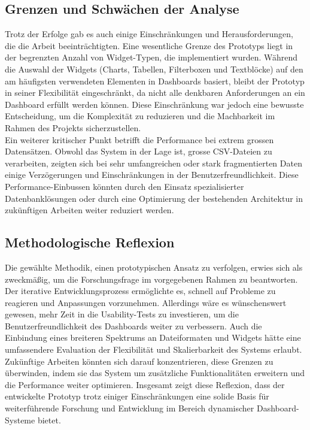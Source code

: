 \documentclass[a4paper, 12pt]{scrartcl}
\begin{document}
\subsection{Grenzen und Schwächen der Analyse}
Trotz der Erfolge gab es auch einige Einschränkungen und Herausforderungen, die die Arbeit beeinträchtigten. Eine wesentliche Grenze des Prototyps liegt in der begrenzten Anzahl von Widget-Typen, die implementiert wurden. Während die Auswahl der Widgets (Charts, Tabellen, Filterboxen und Textblöcke) auf den am häufigsten verwendeten Elementen in Dashboards basiert, bleibt der Prototyp in seiner Flexibilität eingeschränkt, da nicht alle denkbaren Anforderungen an ein Dashboard erfüllt werden können. Diese Einschränkung war jedoch eine bewusste Entscheidung, um die Komplexität zu reduzieren und die Machbarkeit im Rahmen des Projekts sicherzustellen.\\[1em]Ein weiterer kritischer Punkt betrifft die Performance bei extrem grossen Datensätzen. Obwohl das System in der Lage ist, grosse CSV-Dateien zu verarbeiten, zeigten sich bei sehr umfangreichen oder stark fragmentierten Daten einige Verzögerungen und Einschränkungen in der Benutzerfreundlichkeit. Diese Performance-Einbussen könnten durch den Einsatz spezialisierter Datenbanklösungen oder durch eine Optimierung der bestehenden Architektur in zukünftigen Arbeiten weiter reduziert werden.

\subsection{Methodologische Reflexion}
Die gewählte Methodik, einen prototypischen Ansatz zu verfolgen, erwies sich als zweckmäßig, um die Forschungsfrage im vorgegebenen Rahmen zu beantworten. Der iterative Entwicklungsprozess ermöglichte es, schnell auf Probleme zu reagieren und Anpassungen vorzunehmen. Allerdings wäre es wünschenswert gewesen, mehr Zeit in die Usability-Tests zu investieren, um die Benutzerfreundlichkeit des Dashboards weiter zu verbessern. Auch die Einbindung eines breiteren Spektrums an Dateiformaten und Widgets hätte eine umfassendere Evaluation der Flexibilität und Skalierbarkeit des Systems erlaubt.\\[1em]Zukünftige Arbeiten könnten sich darauf konzentrieren, diese Grenzen zu überwinden, indem sie das System um zusätzliche Funktionalitäten erweitern und die Performance weiter optimieren. Insgesamt zeigt diese Reflexion, dass der entwickelte Prototyp trotz einiger Einschränkungen eine solide Basis für weiterführende Forschung und Entwicklung im Bereich dynamischer Dashboard-Systeme bietet.
\end{document}
